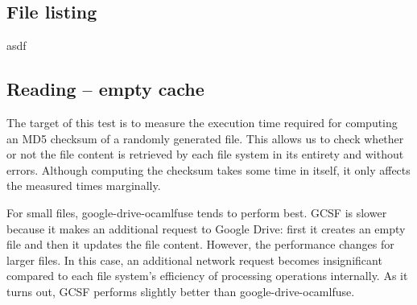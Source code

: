 \subsection{File listing} \label{list_benchmark}

asdf

\subsection{Reading -- empty cache}

The target of this test is to measure the execution time required for computing an MD5 checksum of a randomly generated file. This allows us to check whether or not the file content is retrieved by each file system in its entirety and without errors. Although computing the checksum takes some time in itself, it only affects the measured times marginally.

\freshreaddata


For small files, google-drive-ocamlfuse tends to perform best. GCSF is slower because it makes an additional request to Google Drive: first it creates an empty file and then it updates the file content. However, the performance changes for larger files. In this case, an additional network request becomes insignificant compared to each file system's efficiency of processing operations internally. As it turns out, GCSF performs slightly better than google-drive-ocamlfuse.

